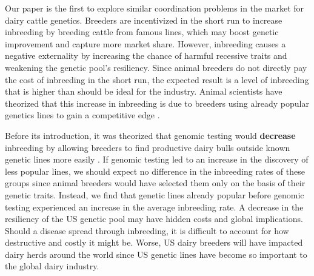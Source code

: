 \documentclass[12pt,letterpaper]{article}
\begin{document}
Our paper is the first to explore similar coordination problems in the market for dairy cattle genetics.
Breeders are incentivized in the short run to increase inbreeding by breeding cattle from famous lines, which may boost genetic improvement and capture more market share.
However, inbreeding causes a negative externality by increasing the chance of harmful recessive traits and weakening the genetic pool's resiliency. 
Since animal breeders do not directly pay the cost of inbreeding in the short run, the expected result is a level of inbreeding that is higher than should be ideal for the industry.
Animal scientists have theorized that this increase in inbreeding is due to breeders using already popular genetics lines to gain a competitive edge \citep{Cole2019}.




Before its introduction, it was theorized that genomic testing would \textbf{decrease} inbreeding by allowing breeders to find productive dairy bulls outside known genetic lines more easily \citep{Daetwyler2007}. 
If genomic testing led to an increase in the discovery of less popular lines, we should expect no difference in the inbreeding rates of these groups since animal breeders would have selected them only on the basis of their genetic traits.
Instead, we find that genetic lines already popular before genomic testing experienced an increase in the average inbreeding rate.
A decrease in the resiliency of the US genetic pool may have hidden costs and global implications.
Should a disease spread through inbreeding, it is difficult to account for how destructive and costly it might be. 
Worse, US dairy breeders will have impacted dairy herds around the world since US genetic lines have become so important to the global dairy industry.
\end{document}
